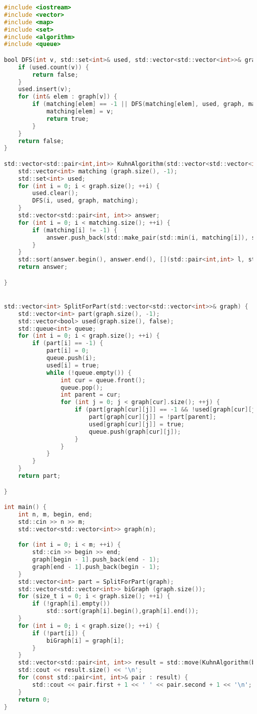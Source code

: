 \begin{lstlisting}[language=C]
#include <iostream>
#include <vector>
#include <map>
#include <set>
#include <algorithm>
#include <queue>

bool DFS(int v, std::set<int>& used, std::vector<std::vector<int>>& graph, std::vector<int>& matching) {
    if (used.count(v)) {
        return false;
    }
    used.insert(v);
    for (int& elem : graph[v]) {
        if (matching[elem] == -1 || DFS(matching[elem], used, graph, matching)) {
            matching[elem] = v;
            return true;
        }
    }
    return false;
}

std::vector<std::pair<int,int>> KuhnAlgorithm(std::vector<std::vector<int>>& graph) {
    std::vector<int> matching (graph.size(), -1);
    std::set<int> used;
    for (int i = 0; i < graph.size(); ++i) {
        used.clear();
        DFS(i, used, graph, matching);
    }
    std::vector<std::pair<int, int>> answer;
    for (int i = 0; i < matching.size(); ++i) {
        if (matching[i] != -1) {
            answer.push_back(std::make_pair(std::min(i, matching[i]), std::max(i, matching[i])));
        }
    }
    std::sort(answer.begin(), answer.end(), [](std::pair<int,int> l, std::pair<int, int> r){ return l.first < r.first; });
    return answer;

}


std::vector<int> SplitForPart(std::vector<std::vector<int>>& graph) {
    std::vector<int> part(graph.size(), -1);
    std::vector<bool> used(graph.size(), false);
    std::queue<int> queue;
    for (int i = 0; i < graph.size(); ++i) {
        if (part[i] == -1) {
            part[i] = 0;
            queue.push(i);
            used[i] = true;
            while (!queue.empty()) {
                int cur = queue.front();
                queue.pop();
                int parent = cur;
                for (int j = 0; j < graph[cur].size(); ++j) {
                    if (part[graph[cur][j]] == -1 && !used[graph[cur][j]]) {
                        part[graph[cur][j]] = !part[parent];
                        used[graph[cur][j]] = true;
                        queue.push(graph[cur][j]);
                    }
                }
            }
        }
    }
    return part;

}

int main() {
    int n, m, begin, end;
    std::cin >> n >> m;
    std::vector<std::vector<int>> graph(n);

    for (int i = 0; i < m; ++i) {
        std::cin >> begin >> end;
        graph[begin - 1].push_back(end - 1);
        graph[end - 1].push_back(begin - 1);
    }
    std::vector<int> part = SplitForPart(graph);
    std::vector<std::vector<int>> biGraph (graph.size());
    for (size_t i = 0; i < graph.size(); ++i) {
        if (!graph[i].empty())
            std::sort(graph[i].begin(),graph[i].end());
    }
    for (int i = 0; i < graph.size(); ++i) {
        if (!part[i]) {
            biGraph[i] = graph[i];
        }
    }
    std::vector<std::pair<int, int>> result = std::move(KuhnAlgorithm(biGraph));
    std::cout << result.size() << '\n';
    for (const std::pair<int, int>& pair : result) {
        std::cout << pair.first + 1 << ' ' << pair.second + 1 << '\n';
    }
    return 0;
}


\end{lstlisting}
